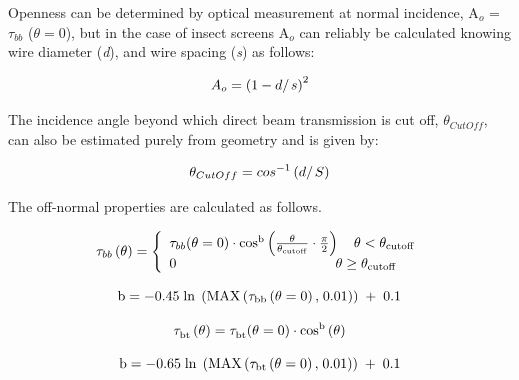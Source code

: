 {Openness can be determined by optical measurement at normal incidence, A\(_{o}\) = $\tau_{bb}$ ($\theta = 0$), but in the case of insect screens A\(_{o}\) can reliably be calculated knowing wire diameter (\emph{d}), and wire spacing (\emph{s}) as follows:

\begin{equation}
{A_o} = {\left( {1 - {d \mathord{\left/ {\vphantom {d s}} \right. } s}} \right)^2}
\end{equation}

The incidence angle beyond which direct beam transmission is cut off, {$\theta$}\(_{CutOff}\), can also be estimated purely from geometry and is given by:

\begin{equation}
{\theta_{CutOff}} = co{s^{ - 1}}\left( {{d \mathord{\left/ {\vphantom {d S}} \right. } S}} \right)
\end{equation}

The off-normal properties are calculated as follows.

\begin{equation}
{\tau_{bb}}\left( {\rm{\theta }} \right) = \left\{ \begin{array}{l}{\tau_{bb}}{\rm{(\theta }} = {\rm{0)}} \cdot {\rm{co}}{{\rm{s}}^{\rm{b}}}\left( {\frac{{\rm{\theta }}}{{{{\rm{\theta }}_{{\rm{cutoff}}}}}} \cdot \frac{\pi }{{\rm{2}}}} \right)\quad {\rm{\theta }} < {{\rm{\theta }}_{{\rm{cutoff}}}}\\0\quad \quad \quad \quad \quad \quad \quad \quad \quad \quad \quad \;\,{\rm{\theta }} \ge {{\rm{\theta }}_{{\rm{cutoff}}}}\end{array} \right.
\end{equation}

\begin{equation}
{\rm{b}} =  - {\rm{0}}{\rm{.45}}\;{\rm{ln}}\;\left( {{\rm{MAX}}\left( {{{\rm{\tau }}_{{\rm{bb}}}}\left( {{\rm{\theta }} = {\rm{0}}} \right){\rm{,}}\;{\rm{0}}{\rm{.01}}} \right)} \right)\; + \;{\rm{0}}{\rm{.1}}
\end{equation}

\begin{equation}
{\rm{\tau }}_{{\rm{bt}}}^{}\left( {\rm{\theta }} \right) = {\rm{\tau }}_{{\rm{bt}}}^{}{\rm{(\theta }} = {\rm{0)}} \cdot {\rm{co}}{{\rm{s}}^{\rm{b}}}\left( {\rm{\theta }} \right)
\end{equation}

\begin{equation}
{\rm{b}} =  - {\rm{0}}{\rm{.65}}\;{\rm{ln}}\;\left( {{\rm{MAX}}\left( {{{\rm{\tau }}_{{\rm{bt}}}}\left( {{\rm{\theta }} = {\rm{0}}} \right){\rm{,}}\;{\rm{0}}{\rm{.01}}} \right)} \right)\; + \;{\rm{0}}{\rm{.1}}
\end{equation}

}
